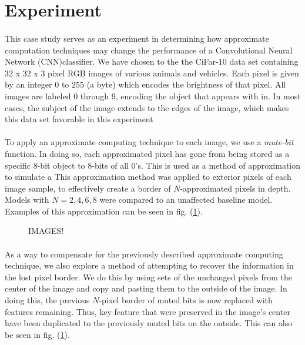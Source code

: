 \documentclass[12pt,letterpaper]{article}
\begin{document}

\section*{Experiment}

\paragraph*{}This case study serves as an experiment in determining how approximate computation techniques may change the performance of a Convolutional Neural Network (CNN)classifier. We have chosen to the the CiFar-10 data set containing 32 x 32 x 3 pixel RGB images of various animals and vehicles. Each pixel is given by an integer $0$ to $255$ (a byte) which encodes the brightness of that pixel. All images are labeled $0$ through $9$, encoding the object that appears with in. In most cases, the subject of the image extends to the edges of the image, which makes this data set favorable in this experiment 
 
\paragraph*{}To apply an approximate computing technique to each image, we use a \textit{mute-bit} function. In doing so, each approximated pixel has gone from being stored as a specific $8$-bit object to $8$-bits of all $0$'s. This is used as a method of approximation to simulate a  This approximation method was applied to exterior pixels of each image sample, to effectively create a border of $N$-approximated pixels in depth. Models with $N = 2,4,6,8$ were compared to an unaffected baseline model. Examples of this approximation can be seen in fig. (\ref{images}).


\begin{figure}[h]
\label{images}
IMAGES!
\end{figure}


\paragraph*{}As a way to compensate for the previously described approximate computing technique, we also explore a method of attempting to recover the information in the lost pixel border. We do this by using sets of the unchanged pixels from the center of the image and copy and pasting them to the outside of the image. In doing this, the previous $N$-pixel border of muted bits is now replaced with features remaining. Thus, key feature that were preserved in the image's center have been duplicated to the previously muted bits on the outside. This can also be seen in fig. (\ref{images}).
\end{document}
